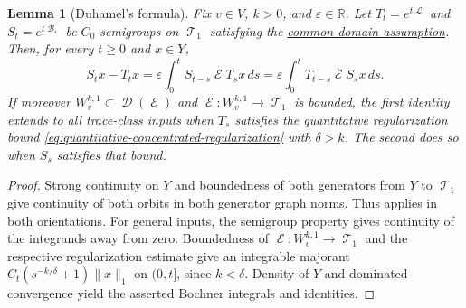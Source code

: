 \documentclass[11pt]{article}
\theoremstyle{myplain}
\newtheorem{lem}[lem]{Lemma}
\theoremstyle{mydefinition}
\theoremstyle{remark}
\DeclareMathOperator{\cB}{\mathcal{B}}
\DeclareMathOperator{\cD}{\mathcal{D}}
\DeclareMathOperator{\cE}{\mathcal{E}}
\DeclareMathOperator{\cL}{\mathcal{L}}
\DeclareMathOperator{\cT}{\mathcal{T}}
\DeclareMathOperator{\1}{\mathds{1}}
\begin{document}
    \begin{lem}[Duhamel's formula]\label{lem:perturbation-duhamel}
        Fix $v \in V$, $k > 0$, and $\varepsilon \in \mathbb R$. Let $T_t = e^{t\cL}$ and $S_t = e^{t\cB_\varepsilon}$ be $C_0$-semigroups on $\cT_1$ satisfying the \hyperref[assum:perturbation-common-domain]{common domain assumption}. Then, for every $t \ge 0$ and $x \in Y$,
        \begin{equation*}
            S_tx-T_tx=\varepsilon\int_0^tS_{t-s}\cE T_sx\,ds
            =\varepsilon\int_0^tT_{t-s}\cE S_sx\,ds.
        \end{equation*}
        If moreover $W_v^{k,1} \subset \cD(\cE)$ and $\cE:W_v^{k,1} \to \cT_1$ is bounded, the first identity extends to all trace-class inputs when $T_s$ satisfies the quantitative regularization bound \eqref{eq:quantitative-concentrated-regularization} with $\delta > k$. The second does so when $S_s$ satisfies that bound.
    \end{lem}
    \begin{proof}
        Strong continuity on $Y$ and boundedness of both generators from $Y$ to $\cT_1$ give continuity of both orbits in both generator graph norms. Thus \cite[Lem.~2.2.5]{Moebus.2025thesis} applies in both orientations. For general inputs, the semigroup property gives continuity of the integrands away from zero. Boundedness of $\cE:W_v^{k,1} \to \cT_1$ and the respective regularization estimate give an integrable majorant $C_t(s^{-k/\delta} + 1)\|x\|_1$ on $(0,t]$, since $k < \delta$. Density of $Y$ and dominated convergence yield the asserted Bochner integrals and identities.
    \end{proof}
    
\end{document}
